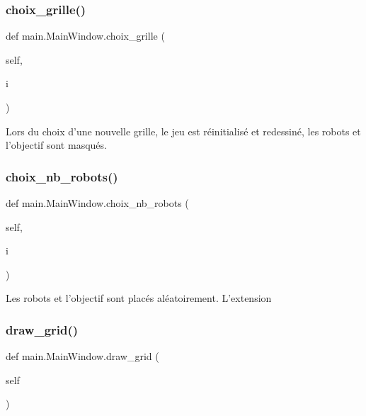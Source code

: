 \subsubsection{\texorpdfstring{choix\+\_\+grille()}{choix\_grille()}}
{\footnotesize\ttfamily def main.\+Main\+Window.\+choix\+\_\+grille (\begin{DoxyParamCaption}\item[{}]{self,  }\item[{}]{i }\end{DoxyParamCaption})}

\begin{DoxyVerb}Lors du choix d'une nouvelle grille, le jeu est réinitialisé et redessiné, les robots et l'objectif sont masqués.
\end{DoxyVerb}
 \mbox{\label{classmain_1_1MainWindow_a50159f6962a6bd8c7195fe9161b7e009}} 
\subsubsection{\texorpdfstring{choix\+\_\+nb\+\_\+robots()}{choix\_nb\_robots()}}
{\footnotesize\ttfamily def main.\+Main\+Window.\+choix\+\_\+nb\+\_\+robots (\begin{DoxyParamCaption}\item[{}]{self,  }\item[{}]{i }\end{DoxyParamCaption})}

\begin{DoxyVerb}Les robots et l'objectif sont placés aléatoirement. L'extension
\end{DoxyVerb}
 \mbox{\label{classmain_1_1MainWindow_a53f8ac0e3d2019681c8eff18c541f412}} 
\subsubsection{\texorpdfstring{draw\+\_\+grid()}{draw\_grid()}}
{\footnotesize\ttfamily def main.\+Main\+Window.\+draw\+\_\+grid (\begin{DoxyParamCaption}\item[{}]{self }\end{DoxyParamCaption})}

